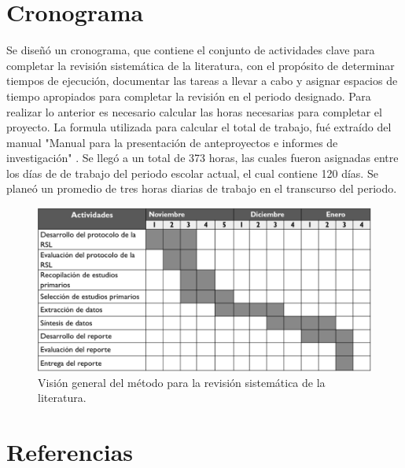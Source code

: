 \documentclass{article}
\begin{document}
\newpage

\section{Cronograma}
Se diseñó un cronograma, que contiene el conjunto de actividades clave para completar la revisión sistemática de la literatura, 
con el propósito de determinar tiempos de ejecución, documentar las tareas a llevar a cabo y asignar espacios de tiempo apropiados 
para completar la revisión en el periodo designado. Para realizar lo anterior es necesario calcular las horas necesarias para completar el proyecto. 
La formula utilizada para calcular el total de trabajo, fué extraído del manual "Manual para la presentación de anteproyectos e informes de investigación" \cite{manualcronograma}.
Se llegó a un total de 373 horas, las cuales fueron asignadas entre los días de de trabajo del periodo escolar actual, el cual contiene 120 días.
Se planeó un promedio de tres horas diarias de trabajo en el transcurso del periodo. 

\begin{figure}[!htb]
   \includegraphics[width=\linewidth]{gant.png}
   \caption{Visión general del método para la revisión sistemática de la literatura.}
   \label{fig:etapasconducción}
\end{figure}

\newpage

\section{Referencias}
\printbibliography
\end{document}
